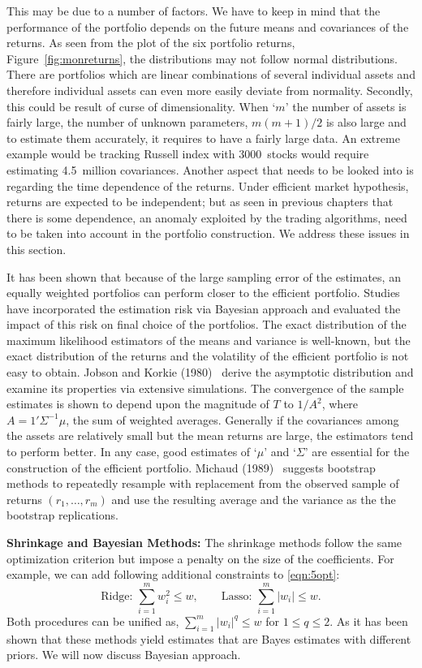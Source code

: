 This may be due to a number of factors. We have to keep in mind that the performance of the portfolio depends on the future means and covariances of the returns. As seen from the plot of the six portfolio returns, Figure~\ref{fig:monreturns}, the distributions may not follow normal distributions. There are portfolios which are linear combinations of several individual assets and therefore individual assets can even more easily deviate from normality. Secondly, this could be result of curse of dimensionality. When `$m$' the number of assets is fairly large, the number of unknown parameters, $m(m+1)/2$ is also large and to estimate them accurately, it requires to have a fairly large data. An extreme example would be tracking Russell index with 3000~stocks would require estimating 4.5~million covariances. Another aspect that needs to be looked into is regarding the time dependence of the returns. Under efficient market hypothesis, returns are expected to be independent; but as seen in previous chapters that there is some dependence, an anomaly exploited by the trading algorithms, need to be taken into account in the portfolio construction. We address these issues in this section. 


It has been shown that because of the large sampling error of the estimates, an equally weighted portfolios can perform closer to the efficient portfolio. Studies have incorporated the estimation risk via Bayesian approach and evaluated the impact of this risk on final choice of the portfolios. The exact distribution of the maximum likelihood estimators of the means and variance is well-known, but the exact distribution of the returns and the volatility of the efficient portfolio is not easy to obtain. Jobson and Korkie (1980)~\cite{jobkor} derive the asymptotic distribution and examine its properties via extensive simulations. The convergence of the sample estimates is shown to depend upon the magnitude of $T$ to $1/A^2$, where $A=1' \Sigma^{-1}\mu$, the sum of weighted averages. Generally if the covariances among the assets are relatively small but the mean returns are large, the estimators tend to perform better. In any case, good estimates of `$\mu$' and `$\Sigma$' are essential for the construction of the efficient portfolio. Michaud (1989)~\cite{michaud} suggests bootstrap methods to repeatedly resample with replacement from the observed sample of returns $(r_1, \ldots, r_m)$ and use the resulting average and the variance as the the bootstrap replications. \twomedskip


\noindent\textbf{Shrinkage and Bayesian Methods:} The shrinkage methods follow the same optimization criterion but impose a penalty on the size of the coefficients. For example, we can add following additional constraints to \eqref{eqn:5opt}:
	\begin{equation} \label{eqn:addconstraint}
	\text{Ridge: } \sum_{i=1}^m w_i^2 \leq w, \qquad \text{Lasso: } \sum_{i=1}^m |w_i| \leq w.
	\end{equation}
Both procedures can be unified as, $\sum_{i=1}^m |w_i|^q \leq w$ for $1 \leq q \leq 2$. As it has been shown that these methods yield estimates that are Bayes estimates with different priors. We will now discuss Bayesian approach. 


